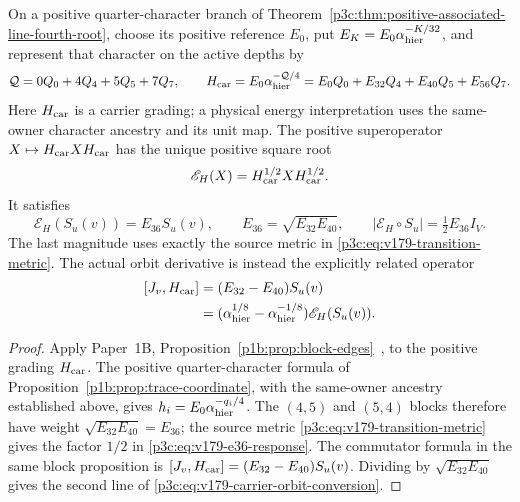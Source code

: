 \documentclass[12pt,a4paper]{article}
\begin{document}
\begin{theorem}
\label{p3c:thm:v179-balanced-hierarchy-response}
On a positive quarter-character branch of
Theorem~\ref{p3c:thm:positive-associated-line-fourth-root}, choose its
positive reference \(E_0\), put \(E_K=E_0\alpha_{\rm hier}^{-K/32}\), and
represent that character on the active depths by
\[
 \mathcal Q=0Q_0+4Q_4+5Q_5+7Q_7,\qquad
 H_{\rm car}=E_0\alpha_{\rm hier}^{-\mathcal Q/4}
 =E_0Q_0+E_{32}Q_4+E_{40}Q_5+E_{56}Q_7 .
\]
Here \(H_{\rm car}\) is a carrier grading; a physical energy interpretation
uses the same-owner character ancestry and its unit map.  The positive
superoperator \(X\mapsto H_{\rm car}XH_{\rm car}\) has the unique positive
square root
\[
 \mathscr E_H(X)=H_{\rm car}^{1/2}XH_{\rm car}^{1/2}.
\]
It satisfies
\begin{equation}
\label{p3c:eq:v179-e36-response}
 \mathscr E_H(S_u(v))=E_{36}S_u(v),\qquad
 E_{36}=\sqrt{E_{32}E_{40}},\qquad
 |\mathscr E_H\circ S_u|=\tfrac12E_{36}I_V .
\end{equation}
The last magnitude uses exactly the source metric in
\eqref{p3c:eq:v179-transition-metric}.  The actual orbit derivative is
instead the explicitly related operator
\begin{equation}
\label{p3c:eq:v179-carrier-orbit-conversion}
\begin{aligned}
 [J_v,H_{\rm car}]
 &=(E_{32}-E_{40})S_u(v)\\
 &=(\alpha_{\rm hier}^{1/8}-\alpha_{\rm hier}^{-1/8})
       \mathscr E_H(S_u(v)).
\end{aligned}
\end{equation}
\end{theorem}
\begin{proof}
Apply Paper~1B, Proposition~\ref{p1b:prop:block-edges}~\cite{Kugelmann2026Paper1B},
to the positive grading \(H_{\rm car}\).  The positive quarter-character
formula of Proposition~\ref{p1b:prop:trace-coordinate}, with the
same-owner ancestry established above, gives
\(h_i=E_0\alpha_{\rm hier}^{-q_i/4}\).
The \((4,5)\) and \((5,4)\) blocks therefore have weight
\(\sqrt{E_{32}E_{40}}=E_{36}\); the source metric
\eqref{p3c:eq:v179-transition-metric} gives the factor \(1/2\) in
\eqref{p3c:eq:v179-e36-response}.  The commutator formula in the same
block proposition is \([J_v,H_{\rm car}]=(E_{32}-E_{40})S_u(v)\).
Dividing by \(\sqrt{E_{32}E_{40}}\) gives the second line of
\eqref{p3c:eq:v179-carrier-orbit-conversion}.
\end{proof}
\end{document}

